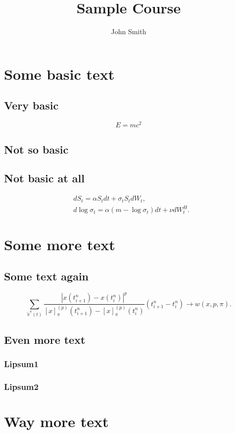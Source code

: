 \documentclass[
    ]{vegalectures}
\title{Sample Course}
\author{John Smith}
\date{}
\begin{document}
    \maketitle

    \tableofcontents

    \introduction
        \lipsum[1-3]
        \cite{Black1976}

    \section{Some basic text}
        \subsection{Very basic}
            \lipsum[4]
            \begin{equation}
                E = mc^2
            \end{equation}
        \subsection{Not so basic}
            \lipsum[5-7]
        \subsection{Not basic at all}
            \begin{align}
                & dS_t          = \alpha S_t dt + \sigma_t S_tdW_t,               \label{model:RFSVasset} \\
                & d\log\sigma_t = \alpha (m - \log\sigma_t) dt + \nu dW_t^H.      \label{model:RFSVvol}
            \end{align}
            \lipsum*[2-4]

    \section{Some more text}
        \subsection{Some text again}
            \lipsum[8-11]
            \begin{equation}
                \sum_{\tilde\pi^n(t)}\frac{\left|x(t_{i+1}^n) - x(t_i^n)\right|^p}{\left[x\right]_{\pi}^{(p)}(t_{i+1}^n)-\left[x\right]_{\pi}^{(p)}(t_i^n)} (t_{i+1}^n-t_{i}^n) \to w(x, p, \pi).
            \end{equation}
        \subsection{Even more text}
            \subsubsection{Lipsum1}
                \lipsum[12-13]
            \subsubsection{Lipsum2}
        

    \section{Way more text}
        \lipsum[17-25]

    \conclusion
        \lipsum[26-30]

\end{document}
